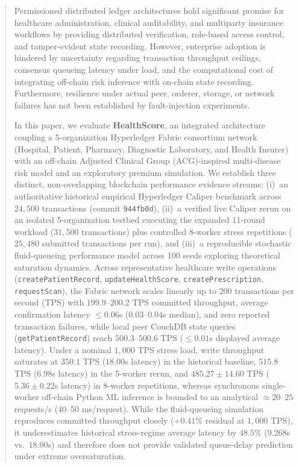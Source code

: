 \documentclass[runningheads]{llncs}
\begin{document}
\begin{abstract}
\sloppy
Permissioned distributed ledger architectures hold significant promise for healthcare administration, clinical auditability, and multiparty insurance workflows by providing distributed verification, role-based access control, and tamper-evident state recording. However, enterprise adoption is hindered by uncertainty regarding transaction throughput ceilings, consensus queueing latency under load, and the computational cost of integrating off-chain risk inference with on-chain state recording. Furthermore, resilience under actual peer, orderer, storage, or network failures has not been established by fault-injection experiments.

In this paper, we evaluate \textbf{HealthScore}, an integrated architecture coupling a 5-organization Hyperledger Fabric consortium network (Hospital, Patient, Pharmacy, Diagnostic Laboratory, and Health Insurer) with an off-chain Adjusted Clinical Group (ACG)-inspired multi-disease risk model and an exploratory premium simulation. We establish three distinct, non-overlapping blockchain performance evidence streams: (i)~an authoritative historical empirical Hyperledger Caliper benchmark across $24,500$ transactions (commit \texttt{944fb0d}), (ii)~a verified live Caliper rerun on an isolated 5-organization testbed executing the expanded 11-round workload ($31,500$ transactions) plus controlled 8-worker stress repetitions ($25,480$ submitted transactions per run), and (iii)~a reproducible stochastic fluid-queueing performance model across 100 seeds exploring theoretical saturation dynamics. Across representative healthcare write operations (\texttt{createPatientRecord}, \texttt{updateHealthScore}, \texttt{createPrescription}, \texttt{requestScan}), the Fabric network scales linearly up to $200$ transactions per second (TPS) with $199.9$--$200.2$ TPS committed throughput, average confirmation latency $\le 0.06$s ($0.03$--$0.04$s median), and zero reported transaction failures, while local peer CouchDB state queries (\texttt{getPatientRecord}) reach $500.3$--$500.6$ TPS ($\le 0.01$s displayed average latency). Under a nominal $1,000$ TPS stress load, write throughput saturates at $350.1$ TPS ($18.00$s latency) in the historical baseline, $515.8$ TPS ($6.98$s latency) in the 5-worker rerun, and $485.27 \pm 14.60$ TPS ($5.36 \pm 0.22$s latency) in 8-worker repetitions, whereas synchronous single-worker off-chain Python ML inference is bounded to an analytical $\approx 20$--$25$ requests/s ($40$--$50$ ms/request). While the fluid-queueing simulation reproduces committed throughput closely ($+0.41\%$ residual at $1,000$ TPS), it underestimates historical stress-regime average latency by $48.5\%$ ($9.268$s vs.\ $18.00$s) and therefore does not provide validated queue-delay prediction under extreme oversaturation.


\end{abstract}
\end{document}
